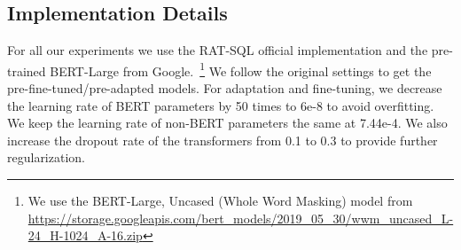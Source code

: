 \documentclass[11pt,a4paper]{article}
\begin{document}
\subsection{Implementation Details}
\label{sec:implementation_details}
For all our experiments we use the RAT-SQL official implementation and the pre-trained BERT-Large from Google.~\footnote{We use the BERT-Large, Uncased (Whole Word Masking) model from \url{https://storage.googleapis.com/bert_models/2019_05_30/wwm_uncased_L-24_H-1024_A-16.zip}}
We follow the original settings to get the pre-fine-tuned/pre-adapted models.
For adaptation and fine-tuning, we decrease the learning rate of BERT parameters by 50 times to 6e-8
to avoid overfitting.
We keep the learning rate of non-BERT parameters the same at 7.44e-4.
We also increase the dropout rate of the transformers from 0.1 to 0.3 to provide further regularization.





 
\end{document}
